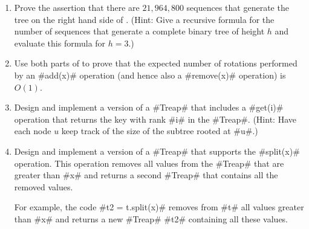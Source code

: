\begin{enumerate}
\item Prove the assertion that there are $21,964,800$ sequences that
generate the tree on the right hand side of .  (Hint:
Give a recursive formula for the number of sequences that generate a
complete binary tree of height $h$ and evaluate this formula for $h=3$.)

\item Use both parts of  to prove that the expected number of rotations performed by an #add(x)# operation (and hence also a #remove(x)# operation) is $O(1)$.

\item Design and implement a version of a #Treap# that includes a #get(i)# operation that returns the key with rank #i# in the #Treap#.  (Hint: Have each node $u$ keep track of the size of the subtree rooted at #u#.)

\item Design and implement a version of a #Treap# that supports the
#split(x)# operation.  This operation removes all values from the #Treap#
that are greater than #x# and returns a second #Treap# that contains all
the removed values.  

For example, the code #t2 = t.split(x)# removes from #t# all values
greater than #x# and returns a new #Treap# #t2# containing all these
values.
\end{enumerate}


